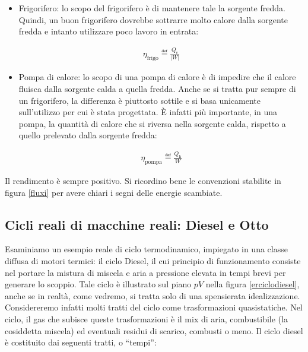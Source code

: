 \begin{itemize}
    \item Frigorifero: lo scopo del frigorifero è di mantenere tale la
    sorgente fredda. Quindi, un buon frigorifero dovrebbe sottrarre molto
    calore dalla sorgente fredda e intanto utilizzare poco lavoro in entrata:

    \begin{align}
        \eta_\text{frigo} \eqdef \frac{Q_\text{c}}{|W|}\label{rfrigo}
    \end{align}

    \item Pompa di calore: lo scopo di una pompa di calore è di impedire che
    il calore fluisca dalla sorgente calda a quella fredda. Anche se si tratta
    pur sempre di un frigorifero, la differenza è piuttosto sottile e si basa
    unicamente sull'utilizzo per cui è stata progettata. È infatti più importante,
    in una pompa, la quantità di calore che si riversa nella sorgente calda,
    rispetto a quello prelevato dalla sorgente fredda:

    \begin{align}
        \eta_\text{pompa} \eqdef \frac{Q_\text{h}}{W}\label{rpompa}
    \end{align}
\end{itemize}

\noindent Il rendimento è sempre positivo.
Si ricordino bene le convenzioni stabilite in figura
\ref{fluxi} per avere chiari i segni delle energie scambiate.

\subsection[Cicli Diesel e Otto]{Cicli reali di macchine reali: Diesel e Otto}
Esaminiamo un esempio reale di ciclo termodinamico, impiegato in
una classe diffusa di motori termici: il ciclo Diesel, il cui
principio di funzionamento consiste nel portare la mistura di
miscela e aria a pressione elevata in tempi brevi per generare
lo scoppio. Tale ciclo
è illustrato sul piano $pV$ nella figura \ref{erciclodiesel}, anche
se in realtà, come vedremo, si tratta solo di una spensierata idealizzazione.
Considereremo infatti molti tratti del ciclo come trasformazioni
quasistatiche. Nel ciclo, il gas che subisce queste trasformazioni
è il mix di aria, combustibile (la cosiddetta miscela) ed
eventuali residui di scarico, combusti o meno.
Il ciclo diesel è costituito dai seguenti tratti, o
``tempi'':

